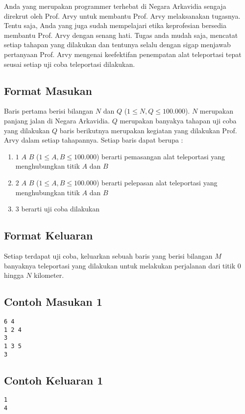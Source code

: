 \documentclass{article}
\begin{document}
Anda yang merupakan programmer terhebat di Negara Arkavidia sengaja direkrut oleh Prof. Arvy untuk membantu Prof. Arvy melaksanakan tugasnya. Tentu saja, Anda yang juga sudah mempelajari etika keprofesian bersedia membantu Prof. Arvy dengan senang hati. Tugas anda mudah saja, mencatat setiap tahapan yang dilakukan dan tentunya selalu dengan sigap menjawab pertanyaan Prof. Arvy mengenai keefektifan penempatan alat teleportasi tepat seusai setiap uji coba teleportasi dilakukan.

\subsection*{Format Masukan}
Baris pertama berisi bilangan $N$ dan $Q$ ($1 \leq N, Q \leq 100.000$). $N$ merupakan panjang jalan di Negara Arkavidia. $Q$ merupakan banyakya tahapan uji coba yang dilakukan
$Q$ baris berikutnya merupakan kegiatan yang dilakukan Prof. Arvy dalam setiap tahapannya. Setiap baris dapat berupa :
\begin{enumerate}
    \setlength\itemsep{0pt}
    \item $1$ $A$ $B$ ($1 \leq A, B \leq 100.000$) berarti pemasangan alat teleportasi yang menghubungkan titik $A$ dan $B$
    \item $2$ $A$ $B$ ($1 \leq A, B \leq 100.000$) berarti pelepasan alat teleportasi yang menghubungkan titik $A$ dan $B$
    \item $3$ berarti uji coba dilakukan
\end{enumerate}


\subsection*{Format Keluaran}
Setiap terdapat uji coba, keluarkan sebuah baris yang berisi bilangan $M$ banyaknya teleportasi yang dilakukan untuk melakukan perjalanan dari titik $0$ hingga $N$ kilometer. 
\\

\begin{multicols}{2}
\subsection*{Contoh Masukan 1}
\begin{lstlisting}
6 4
1 2 4
3
1 3 5
3
\end{lstlisting}
\columnbreak
\subsection*{Contoh Keluaran 1}
\begin{lstlisting}
1
4
\end{lstlisting}
\vfill
\null
\end{multicols}
\end{document}
